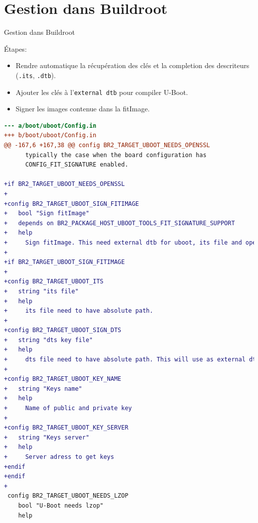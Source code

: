 \documentclass[aspectratio=169]{beamer}
\begin{document}
\section{Gestion dans Buildroot}

\begin{frame}
\begin{center}
\huge{Gestion dans Buildroot}
\end{center}
\end{frame}

\begin{frame}
Étapes:
\begin{itemize}
\item Rendre automatique la récupération des clés et la completion des descriteurs (\texttt{.its}, \texttt{.dtb}).
\item Ajouter les clés à l'\texttt{external dtb} pour compiler U-Boot.
\item Signer les images contenue dans la fitImage.
\end{itemize}
\end{frame}

\begin{frame}[fragile]
\begin{lstlisting}[language=diff,basicstyle=\fontsize{5}{5}\selectfont\ttfamily\color{white}]
--- a/boot/uboot/Config.in
+++ b/boot/uboot/Config.in
@@ -167,6 +167,38 @@ config BR2_TARGET_UBOOT_NEEDS_OPENSSL
 	  typically the case when the board configuration has
 	  CONFIG_FIT_SIGNATURE enabled.
 
+if BR2_TARGET_UBOOT_NEEDS_OPENSSL
+
+config BR2_TARGET_UBOOT_SIGN_FITIMAGE
+	bool "Sign fitImage"
+	depends on BR2_PACKAGE_HOST_UBOOT_TOOLS_FIT_SIGNATURE_SUPPORT
+	help
+	  Sign fitImage. This need external dtb for uboot, its file and openssl key.
+
+if BR2_TARGET_UBOOT_SIGN_FITIMAGE
+
+config BR2_TARGET_UBOOT_ITS
+	string "its file"
+	help
+	  its file need to have absolute path.
+
+config BR2_TARGET_UBOOT_SIGN_DTS
+	string "dts key file"
+	help
+	  dts file need to have absolute path. This will use as external dtb.
+
+config BR2_TARGET_UBOOT_KEY_NAME
+	string "Keys name"
+	help
+	  Name of public and private key
+
+config BR2_TARGET_UBOOT_KEY_SERVER
+	string "Keys server"
+	help
+	  Server adress to get keys
+endif
+endif
+
 config BR2_TARGET_UBOOT_NEEDS_LZOP
 	bool "U-Boot needs lzop"
 	help
\end{lstlisting}
\end{frame}
\end{document}
